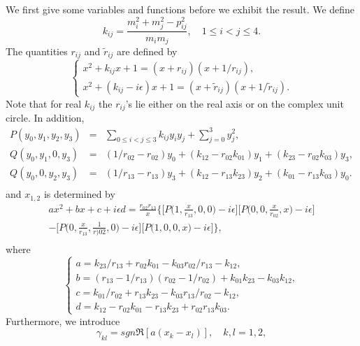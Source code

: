 We first give some variables and functions before we exhibit the result. We define
\begin{equation}
k_{ij}=\frac{m^2_i+m^2_j-p_{ij}^2}{m_i m_j}, \quad 1\leq i<j\leq 4.
\end{equation}
The quantities $r_{ij}$ and $\widetilde{r}_{ij}$ are defined by 
\begin{equation}
\begin{cases}
x^2+k_{ij}x+1=(x+r_{ij})(x+1/r_{ij}),\\
x^2+(k_{ij}-i\epsilon)x+1=(x+\widetilde{r}_{ij})(x+1/\widetilde{r}_{ij}).
\end{cases}
\end{equation} 
Note that for real $k_{ij}$ the $r_{ij}$'s lie either on the real axis or on the complex unit circle. In addition,
\begin{eqnarray}
P(y_0,y_1,y_2,y_3)&=&\sum_{0\leq i<j\leq 3}k_{ij}y_i y_j+\sum_{j=0}^{3}y^2_j,\nonumber\\
Q(y_0,y_1,0,y_3)&=&(1/r_{02}-r_{02})y_0+(k_{12}-r_{02}k_{01})y_1+(k_{23}-r_{02}k_{03})y_3,\nonumber\\
Q(y_0,0,y_2,y_3)&=&(1/r_{13}-r_{13})y_3+(k_{12}-r_{13}k_{23})y_2+(k_{01}-r_{13}k_{03})y_0.\nonumber\\
\end{eqnarray}
and $x_{1,2}$ is determined by
\begin{eqnarray}
ax^2+bx+c+i\epsilon d=\frac{r_{02}r_{13}}{x}\biggl\{ \biggl[ P   \biggl(1,\frac{x}{r_{13}},0,0 \biggr)-i\epsilon\biggr]\biggl[ P   \biggl(0,0,\frac{x}{r_{02}},x \biggr)-i\epsilon\biggr]\nonumber\\
-\biggl[ P   \biggl(0,\frac{x}{r_{13}},\frac{1}{r){02}},0 \biggr)-i\epsilon\biggr]\biggl[ P   \biggl(1,0,0,x \biggr)-i\epsilon\biggr] \biggr\},\nonumber\\
\end{eqnarray}
where
\begin{equation}
\begin{cases}
a=k_{23}/r_{13}+r_{02}k_{01}-k_{03}r_{02}/r_{13}-k_{12},\\
b=(r_{13}-1/r_{13})(r_{02}-1/r_{02})+k_{01}k_{23}-k_{03}k_{12},\\
c=k_{01}/r_{02}+r_{13}k_{23}-k_{03}r_{13}/r_{02}-k_{12},\\
d=k_{12}-r_{02}k_{01}-r_{13}k_{23}+r_{02}r_{13}k_{03}.
\end{cases}
\end{equation}
Furthermore, we introduce
\begin{equation}
\gamma_{kl}=sgn\Re[a(x_k-x_l)], \quad k,l=1,2,
\end{equation}
